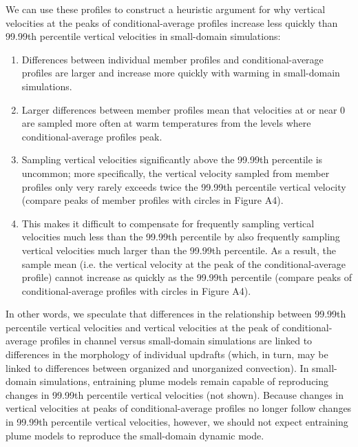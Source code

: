 \documentclass[twocol]{ametsoc}
\begin{document}
We can use these profiles to construct a heuristic argument for why vertical velocities at the peaks of conditional-average profiles increase less quickly than 99.99th percentile vertical velocities in small-domain simulations:

\begin{enumerate}
\item Differences between individual member profiles and conditional-average profiles are larger and increase more quickly with warming in small-domain simulations.
\item Larger differences between member profiles mean that velocities at or near 0 are sampled more often at warm temperatures from the levels where conditional-average profiles peak.
\item Sampling vertical velocities significantly above the 99.99th percentile is uncommon; more specifically, the vertical velocity sampled from member profiles only very rarely exceeds twice the 99.99th percentile vertical velocity (compare peaks of member profiles with circles in Figure A4).
\item This makes it difficult to compensate for frequently sampling vertical velocities much less than the 99.99th percentile by also frequently sampling vertical velocities much larger than the 99.99th percentile. As a result, the sample mean (i.e. the vertical velocity at the peak of the conditional-average profile) cannot increase as quickly as the 99.99th percentile (compare peaks of conditional-average profiles with circles in Figure A4).
\end{enumerate}

In other words, we speculate that differences in the relationship between 99.99th percentile vertical velocities and vertical velocities at the peak of conditional-average profiles in channel versus small-domain simulations are linked to differences in the morphology of individual updrafts (which, in turn, may be linked to differences between organized and unorganized convection). In small-domain simulations, entraining plume models remain capable of reproducing changes in 99.99th percentile vertical velocities (not shown). Because changes in vertical velocities at peaks of conditional-average profiles no longer follow changes in 99.99th percentile vertical velocities, however, we should not expect entraining plume models to reproduce the small-domain dynamic mode.



\end{document}
